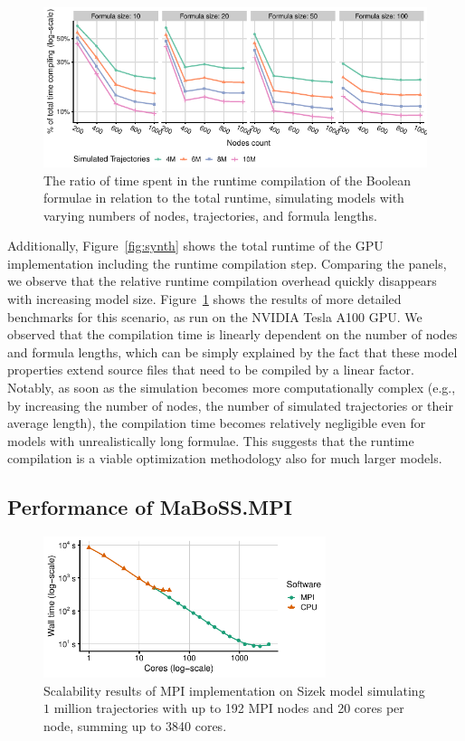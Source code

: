 \documentclass[sn-mathphys-num]{sn-jnl}%
\begin{document}
\begin{figure}
    \centering
    \includegraphics[width=\linewidth]{plots/nodes-compilation-big-NVIDIA Tesla A100 (MaBoSS.GPU).pdf}
    \caption{The ratio of time spent in the runtime compilation of the Boolean formulae in relation to the total runtime, simulating models with varying numbers of nodes, trajectories, and formula lengths.}
    \label{fig:comp}
\end{figure}

Additionally, Figure~\ref{fig:synth} shows the total runtime of the GPU implementation including the runtime compilation step. Comparing the panels, we observe that the relative runtime compilation overhead quickly disappears with increasing model size. Figure~\ref{fig:comp} shows the results of more detailed benchmarks for this scenario, as run on the NVIDIA Tesla A100 GPU. We observed that the compilation time is linearly dependent on the number of nodes and formula lengths, which can be simply explained by the fact that these model properties extend source files that need to be compiled by a linear factor. Notably, as soon as the simulation becomes more computationally complex (e.g., by increasing the number of nodes, the number of simulated trajectories or their average length), the compilation time becomes relatively negligible even for models with unrealistically long formulae. This suggests that the runtime compilation is a viable optimization methodology also for much larger models.

\subsection{Performance of MaBoSS.MPI}


\begin{figure}%
\centering
\includegraphics[width=3.25in]{plots/sizek_mpi.pdf}
\caption{Scalability results of MPI implementation on Sizek model simulating $1$ million trajectories with up to 192 MPI nodes and 20 cores per node, summing up to 3840 cores.}
\label{fig:sizek_results}
\end{figure}
\end{document}
